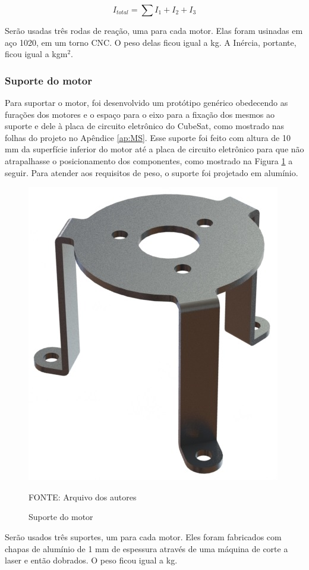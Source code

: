 \documentclass[
	12pt,				%
	openany,			%
	twoside,			%
	a4paper,			%
	english,			%
	french,				%
	spanish,			%
	brazil,				%
	oldfontcommands
	]{abntex2}
\begin{document}
\begin{equation}
I_{total} = \sum\nolimits I_{1} + I_{2} + I_{3}
\label{eq:Inetot}
\end{equation}

Serão usadas três rodas de reação, uma para cada motor. Elas foram usinadas em aço 1020, em um torno CNC. O peso delas ficou igual a  kg. A Inércia, portante, ficou igual a  kgm$^2$.

\subsubsection{Suporte do motor}

Para suportar o motor, foi desenvolvido um protótipo genérico obedecendo as furações dos motores e o espaço para o eixo para a fixação dos mesmos ao suporte e dele à placa de circuito eletrônico do CubeSat, como mostrado nas folhas do projeto no Apêndice \ref{ap:MS}. Esse suporte foi feito com altura de 10 mm da superfície inferior do motor até a placa de circuito eletrônico para que não atrapalhasse o posicionamento dos componentes, como mostrado na Figura \ref{fig:MS} a seguir. Para atender aos requisitos de peso, o suporte foi projetado em alumínio.

\newpage

\begin{figure}[th]
	\caption{Suporte do motor}
	\centering
	\includegraphics[width=0.5\linewidth]{./figs/Motor_Sup}
	
	\begin{small}
		FONTE: Arquivo dos autores
	\end{small}
	\label{fig:MS}
\end{figure}

Serão usados três suportes, um para cada motor. Eles foram fabricados com chapas de alumínio de 1 mm de espessura através de uma máquina de corte a laser e então dobrados. O peso ficou igual a  kg.
\end{document}
